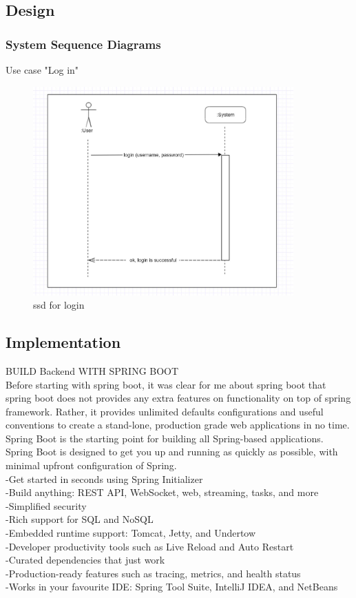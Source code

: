 \documentclass{scrartcl}
\begin{document}
\subsection{Design}
\subsubsection{System Sequence Diagrams}
 Use case "Log in"
\begin{figure}[H]
\centering
\includegraphics[width = 100mm]{ssd-login.JPG}
\caption{ssd for login}
\label{ssd for login}
\end{figure}






\subsection{Implementation}
BUILD Backend WITH SPRING BOOT\\
Before starting with spring boot, it was clear for me about spring boot that spring boot does not provides any extra features on functionality on top of spring framework. Rather, it provides unlimited defaults configurations and useful conventions to create a stand-lone, production grade web applications in no time.\\
Spring Boot is the starting point for building all Spring-based applications. Spring Boot is designed to get you up and running as quickly as possible, with minimal upfront configuration of Spring.\\
 -Get started in seconds using Spring Initializer\\
-Build anything: REST API, WebSocket, web, streaming, tasks, and more\\
-Simplified security\\
-Rich support for SQL and NoSQL\\
-Embedded runtime support: Tomcat, Jetty, and Undertow\\
-Developer productivity tools such as Live Reload and Auto Restart\\
-Curated dependencies that just work\\
-Production-ready features such as tracing, metrics, and health status\\
-Works in your favourite IDE: Spring Tool Suite, IntelliJ IDEA, and NetBeans\\
\end{document}
